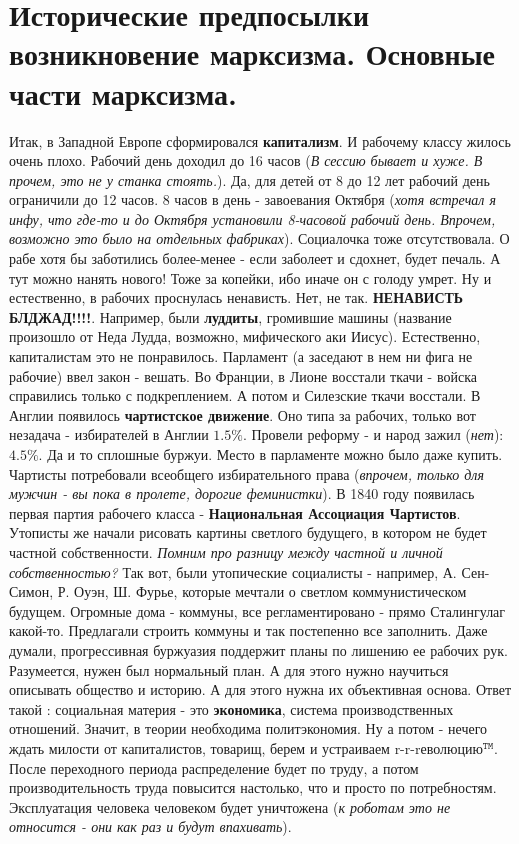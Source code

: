 \section{Исторические предпосылки возникновение марксизма. Основные части марксизма.}
Итак, в Западной Европе сформировался \textbf{капитализм}. И рабочему классу жилось очень плохо. Рабочий день доходил до 16 часов (\textit{В сессию бывает и хуже. В прочем, это не у станка стоять.}). Да, для детей от 8 до 12 лет рабочий день ограничили до 12 часов. 8 часов в день - завоевания Октября (\textit{хотя встречал я инфу, что где-то и до Октября установили 8-часовой рабочий день. Впрочем, возможно это было на отдельных фабриках}). Социалочка тоже отсутствовала. О рабе хотя бы заботились более-менее - если заболеет и сдохнет, будет печаль. А тут можно нанять нового! Тоже за копейки, ибо иначе он с голоду умрет. Ну и естественно, в рабочих проснулась ненависть. Нет, не так. \textbf{НЕНАВИСТЬ БЛДЖАД!!!!}.
Например, были \textbf{луддиты}, громившие машины (название произошло от Неда Лудда, возможно, мифического аки Иисус). Естественно, капиталистам это не понравилось. Парламент (а заседают в нем ни фига не рабочие) ввел закон - вешать. Во Франции, в Лионе восстали ткачи - войска справились только с подкреплением. А потом и Силезские ткачи восстали. В Англии появилось \textbf{чартистское движение}. Оно типа за рабочих, только вот незадача - избирателей в Англии $1.5 \%$. Провели реформу - и народ зажил (\textit{нет}): $4.5 \%$. Да и то сплошные буржуи. Место в парламенте можно было даже купить. Чартисты потребовали всеобщего избирательного права (\textit{впрочем, только для мужчин - вы пока в пролете, дорогие феминистки}). В 1840 году появилась первая партия рабочего класса - \textbf{Национальная Ассоциация Чартистов}. Утописты же начали рисовать картины светлого будущего, в котором не будет частной собственности. \textit{Помним про разницу между частной и личной собственностью?}
Так вот, были утопические социалисты - например, А. Сен-Симон, Р. Оуэн, Ш. Фурье, которые мечтали о светлом коммунистическом будущем. Огромные дома - коммуны, все регламентировано - прямо Сталингулаг какой-то. Предлагали строить коммуны и так постепенно все заполнить. Даже думали, прогрессивная буржуазия поддержит планы по лишению ее рабочих рук. Разумеется, нужен был нормальный план. А для этого нужно научиться описывать общество и историю. А для этого нужна их объективная основа. Ответ такой : социальная материя - это \textbf{экономика}, система производственных отношений. Значит, в теории необходима политэкономия. Ну а потом - нечего ждать милости от капиталистов, товарищ, берем и устраиваем r-r-rеволюцию${}^\mathtt{TM}$. После переходного периода распределение будет по труду, а потом производительность труда повысится настолько, что и просто по потребностям. Эксплуатация человека человеком будет уничтожена (\textit{к роботам это не относится - они как раз и будут впахивать}). 

